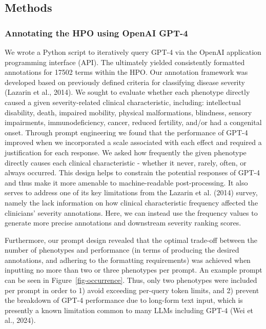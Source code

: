 \documentclass[
]{agujournal2019}
\begin{document}
\subsection{Methods}\label{methods}

\subsubsection{Annotating the HPO using OpenAI
GPT-4}\label{annotating-the-hpo-using-openai-gpt-4}

We wrote a Python script to iteratively query GPT-4 via the OpenAI
application programming interface (API). The ultimately yielded
consistently formatted annotations for 17502 terms within the HPO. Our
annotation framework was developed based on previously defined criteria
for classifying disease severity (Lazarin et al., 2014). We sought to
evaluate whether each phenotype directly caused a given severity-related
clinical characteristic, including: intellectual disability, death,
impaired mobility, physical malformations, blindness, sensory
impairments, immunodeficiency, cancer, reduced fertility, and/or had a
congenital onset. Through prompt engineering we found that the
performance of GPT-4 improved when we incorporated a scale associated
with each effect and required a justification for each response. We
asked how frequently the given phenotype directly causes each clinical
characteristic - whether it never, rarely, often, or always occurred.
This design helps to constrain the potential responses of GPT-4 and thus
make it more amenable to machine-readable post-processing. It also
serves to address one of its key limitations from the Lazarin et al.
(2014) survey, namely the lack information on how clinical
characteristic frequency affected the clinicians' severity annotations.
Here, we can instead use the frequency values to generate more precise
annotations and downstream severity ranking scores.

Furthermore, our prompt design revealed that the optimal trade-off
between the number of phenotypes and performance (in terms of producing
the desired annotations, and adhering to the formatting requirements)
was achieved when inputting no more than two or three phenotypes per
prompt. An example prompt can be seen in Figure~\ref{fig-occurrence}.
Thus, only two phenotypes were included per prompt in order to 1) avoid
exceeding per-query token limits, and 2) prevent the breakdown of GPT-4
performance due to long-form text input, which is presently a known
limitation common to many LLMs including GPT-4 (Wei et al., 2024).
\end{document}
